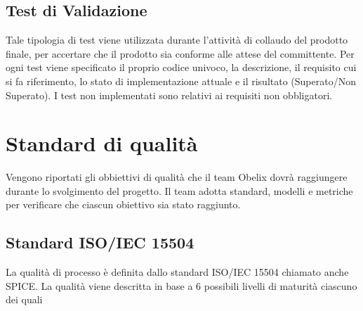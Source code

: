 {

\subsection{Test di Validazione}

Tale tipologia di test viene utilizzata durante l'attività di collaudo
del prodotto finale, per accertare che il prodotto sia conforme alle
attese del committente. Per ogni test viene specificato il proprio
codice univoco, la descrizione, il requisito cui si fa riferimento, lo
stato di implementazione attuale e il risultato (Superato/Non
Superato).
I test non implementati sono relativi ai requisiti non obbligatori. 
 


  \clearpage


  \appendix


  \section{Standard di qualità}

  Vengono riportati gli obbiettivi di qualità che il team Obelix
  dovrà raggiungere durante lo svolgimento del progetto.  Il team
  adotta  standard, modelli e metriche per verificare che ciascun
  obiettivo sia stato raggiunto.


  \subsection{Standard ISO/IEC 15504}


 La qualità di processo è definita dallo standard ISO/IEC 15504
 chiamato anche SPICE. 
 La qualità viene descritta in base a 6 possibili livelli di maturità
 ciascuno dei quali 





}
